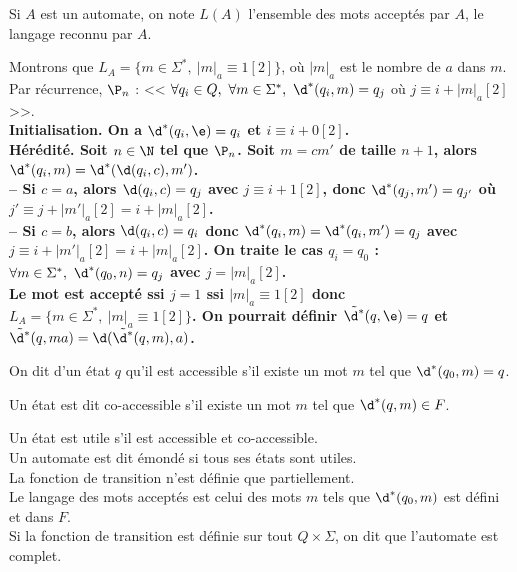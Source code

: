 \documentclass[french, 11pt]{article}
\renewcommand*{\S}{\Sigma}
\begin{document}
\begin{defi}{}{}
    Si $A$ est un automate, on note $L(A)$ l'ensemble des mots acceptés par $A$, le langage reconnu par $A$.
\end{defi}

\begin{ex}{}{}
    Montrons que $L_A=\{m\in\S^*, ~ |m|_a \equiv 1[2]\}$, où $|m|_a$ est le nombre de $a$ dans $m$.
    \tcblower
    Par récurrence, $\P_n$ : << $\forall q_i \in Q, ~ \forall m \in \S^*, ~ \d^*(q_i,m)=q_j$ où $j\equiv i+|m|_a[2]$ >>.\\
    \bf{Initialisation.} On a $\d^*(q_i,\e)=q_i$ et $i\equiv i+0[2]$.\\
    \bf{Hérédité.} Soit $n\in\N$ tel que $\P_n$. Soit $m=cm'$ de taille $n+1$, alors $\d^*(q_i,m)=\d^*(\d(q_i,c),m')$.\\
    -- Si $c=a$, alors $\d(q_i,c)=q_j$ avec $j\equiv i+1[2]$, donc $\d^*(q_j,m')=q_{j'}$ où $j'\equiv j+|m'|_a[2]=i+|m|_a[2]$.\\
    -- Si $c=b$, alors $\d(q_i,c)=q_i$ donc $\d^*(q_i,m)=\d^*(q_i,m')=q_j$ avec $j\equiv i+|m'|_a[2]=i+|m|_a[2]$.\n
    On traite le cas $q_i=q_0$ : $\forall m \in \S^*, ~ \d^*(q_0,n)=q_j$ avec $j=|m|_a[2]$.\\
    Le mot est accepté ssi $j=1$ ssi $|m|_a\equiv1[2]$ donc $L_A=\{m\in\S^*,~|m|_a\equiv1[2]\}$.\n
    On pourrait définir $\tilde{\d^*}(q,\e)=q$ et $\tilde{\d^*}(q,ma)=\d(\tilde{\d^*}(q,m),a)$.
\end{ex}

\begin{defi}{}{}
    On dit d'un état $q$ qu'il est accessible s'il existe un mot $m$ tel que $\d^*(q_0,m)=q$.
\end{defi}

\begin{defi}{}{}
    Un état est dit co-accessible s'il existe un mot $m$ tel que $\d^*(q,m)\in F$.
\end{defi}

\begin{defi}{}{}
    Un état est utile s'il est accessible et co-accessible.\\
    Un automate est dit émondé si tous ses états sont utiles.\\
    La fonction de transition n'est définie que partiellement.\\
    Le langage des mots acceptés est celui des mots $m$ tels que $\d^*(q_0,m)$ est défini et dans $F$.\\
    Si la fonction de transition est définie sur tout $Q\times\S$, on dit que l'automate est complet.
\end{defi}
\end{document}
